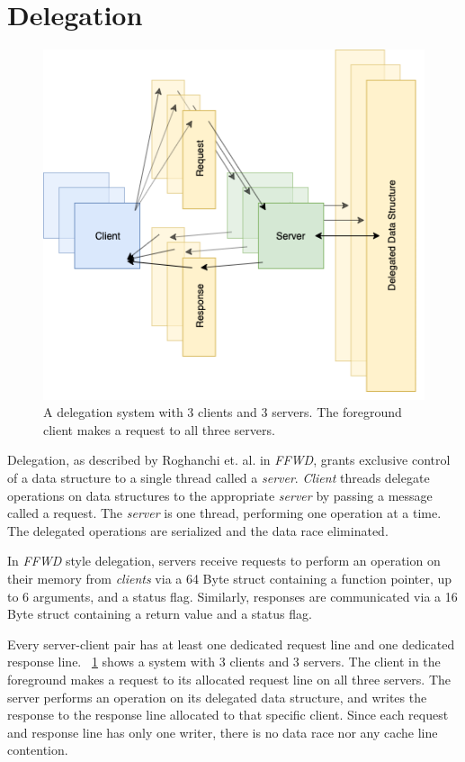 \documentclass{uicthesi}
\begin{document}
\section{Delegation}
\begin{figure}[ht!]
\centering
\includegraphics[width=0.9\columnwidth]{FIG/general_delegation.png}
\caption{A delegation system with 3 clients and 3 servers. The foreground client makes a request to all three servers. }
\label{fig:general_delegation}
\end{figure}
Delegation, as described by Roghanchi et. al. in \textit{FFWD}\cite{ffwd}, grants exclusive control of a data structure to a single thread called a \textit{server}. \textit{Client} threads delegate operations on data structures to the appropriate \textit{server} by passing a message called a request. The \textit{server} is one thread, performing one operation at a time. The delegated operations are serialized and the data race eliminated. 

In \textit{FFWD} style delegation, servers receive requests to perform an operation on their memory from \textit{clients} via a 64 Byte struct containing a function pointer, up to 6 arguments, and a status flag. Similarly, responses are communicated via a 16 Byte struct containing a return value and a status flag.  

Every server-client pair has at least one dedicated request line and one dedicated response line. ~\ref{fig:general_delegation} shows a system with 3 clients and 3 servers. The client in the foreground makes a request to its allocated request line on all three servers. The server performs an operation on its delegated data structure, and writes the response to the response line allocated to that specific client. Since each request and response line has only one writer, there is no data race nor any cache line contention.
\end{document}
